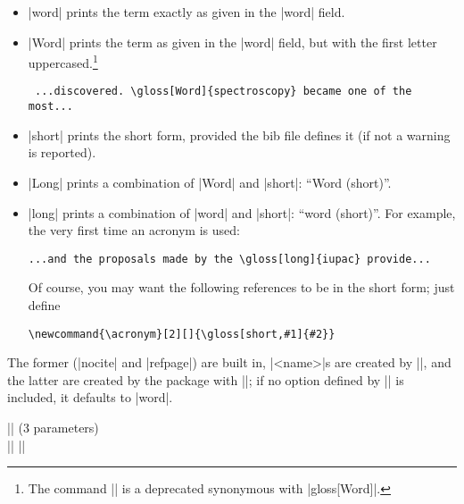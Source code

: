 \documentclass{ltxguide}
\newcommand{\gloss}{\textsf{gloss}}
\begin{document}
\begin{itemize}

\item |word| prints the term exactly as given in the |word| field.

\item |Word| prints the term as given in the |word| field, but 
  with the first letter uppercased.\footnote{%
  The command |\string\Gloss| is a deprecated synonymous with
  |\string\gloss[Word]|.}

\begin{verbatim}
 ...discovered. \gloss[Word]{spectroscopy} became one of the most...
\end{verbatim}

\item |short| prints the short form, provided the bib file defines it
  (if not a warning is reported).

\item |Long| prints a combination of |Word| and |short|: ``Word 
  (short)''.

\item |long| prints a combination of |word| and |short|: ``word 
(short)''.  For example, the very first time an acronym is used:
\begin{verbatim}
...and the proposals made by the \gloss[long]{iupac} provide...
\end{verbatim}
  Of course, you may want the following references to be in the short
  form; just define
\begin{verbatim}
\newcommand{\acronym}[2][]{\gloss[short,#1]{#2}}
\end{verbatim}

\end{itemize} The former (|nocite| and |refpage|) are built in, 
|<name>|s are created by |\newgloss|, and the latter are created by 
the package with |\setglosstext|; if no option defined by 
|\setglosstext| is included, it defaults to |word|.

\begin{decl}
|| \quad (3 parameters)\\
|| \qquad ||
\end{decl}
\end{document}
